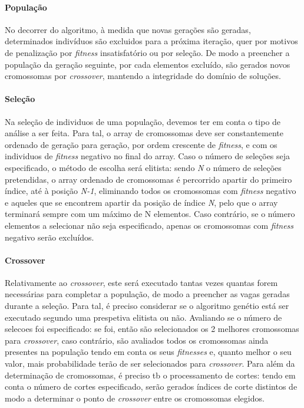 \documentclass[a4paper]{article}
\begin{document}
\paragraph{População}
No decorrer do algoritmo, à medida que novas gerações são geradas, determinados indivíduos são excluidos para a próxima iteração, quer por motivos de penalização por \textit{fitness} insatisfatório ou por seleção. De modo a preencher a população da geração seguinte, por cada elementos excluído, são gerados novos cromossomas por \textit{crossover}, mantendo a integridade do domínio de soluções.
\newpage
\paragraph{Seleção}
Na seleção de individuos de uma população, devemos ter em conta o tipo de análise a ser feita. Para tal, o array de cromossomas deve ser constantemente ordenado de geração para geração, por ordem crescente de \textit{fitness}, e com os individuos de \textit{fitness} negativo no final do array. Caso o número de seleções seja especificado, o método de escolha será elitista: sendo \textit{N} o número de seleções pretendidas, o array ordenado de cromossomas é percorrido apartir do primeiro índice, até à posição \textit{N-1}, eliminando todos os cromossomas com \textit{fitness} negativo e aqueles que se encontrem apartir da posição de índice \textit{N}, pelo que o array terminará sempre com um máximo de N elementos. Caso contrário, se o número elementos a selecionar não seja especificado, apenas os cromossomas com \textit{fitness} negativo serão excluídos.
\paragraph{Crossover}
Relativamente ao \textit{crossover}, este será executado tantas vezes quantas forem necessárias para completar a população, de modo a preencher as vagas geradas durante a seleção. Para tal, é preciso considerar se o algoritmo genétio está ser executado segundo uma prespetiva elitista ou não. Avaliando se o número de selecoes foi especificado: se foi, então são selecionados os 2 melhores cromossomas para \textit{crossover}, caso contrário, são avaliados todos os cromossomas ainda presentes na população tendo em conta os seus \textit{fitnesses} e, quanto melhor o seu valor, mais probabilidade terão de ser selecionados para \textit{crossover}. Para além da determinação de cromossomas, é preciso tb o processamento de cortes: tendo em conta o número de cortes especificado, serão gerados índices de corte distintos de modo a determinar o ponto de \textit{crossover} entre os cromossomas elegidos.
\end{document}

